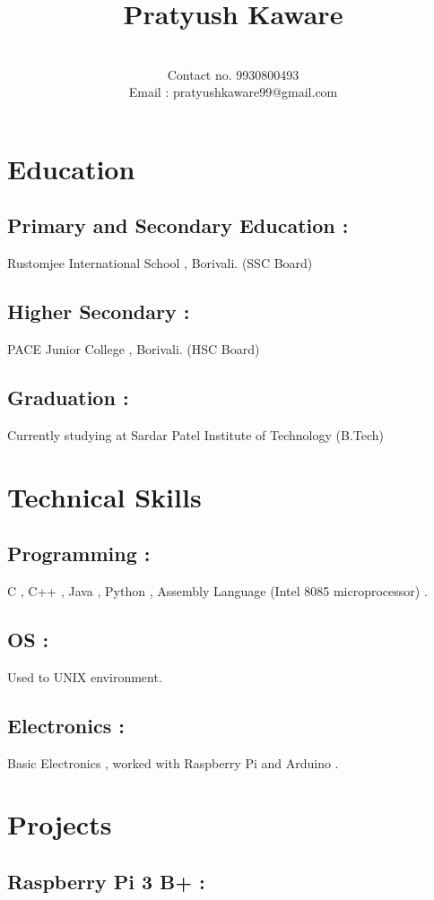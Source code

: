 \documentclass{article}
\begin{document}
\title{Pratyush Kaware}
\author{\\Contact no. 9930800493 \\ Email : pratyushkaware99@gmail.com }
\maketitle
\section{Education}
    \subsection{Primary and Secondary Education :}
    Rustomjee International School , Borivali. (SSC Board) 
    \subsection{Higher Secondary :}
    PACE Junior College , Borivali. (HSC Board)
    \subsection{Graduation :}
    Currently studying at Sardar Patel Institute of Technology (B.Tech)
\section{\newpage Technical Skills}
    \subsection{Programming :}
    C , C++ , Java , Python , Assembly Language (Intel 8085 microprocessor) .
    \subsection{OS :}
    Used to UNIX environment.
    \subsection{Electronics :}
    Basic Electronics , worked with Raspberry Pi and Arduino .
\section{\newpage Projects}
    \subsection{Raspberry Pi 3 B+ :}
\end{document}
